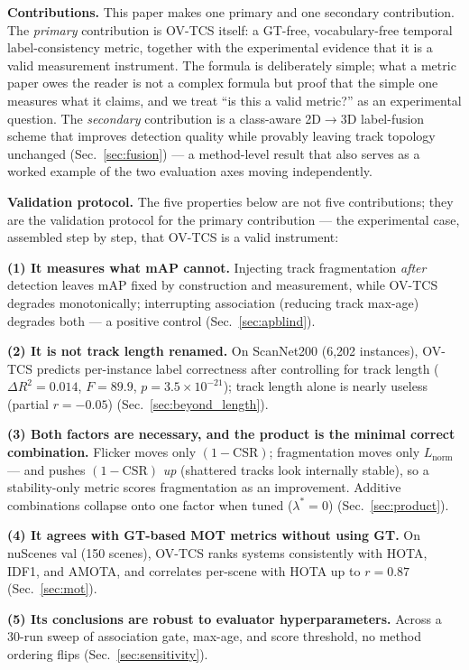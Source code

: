 \documentclass[10pt,twocolumn,letterpaper]{article}
\newcommand{\csr}{\mathrm{CSR}}
\newcommand{\lnorm}{L_{\mathrm{norm}}}
\begin{document}
\noindent\textbf{Contributions.} This paper makes one primary and one
secondary contribution. The \emph{primary} contribution is OV-TCS itself:
a GT-free, vocabulary-free temporal label-consistency metric, together with
the experimental evidence that it is a valid measurement instrument. The
formula is deliberately simple; what a metric paper owes the reader is not a
complex formula but proof that the simple one measures what it claims, and we
treat ``is this a valid metric?'' as an experimental question. The
\emph{secondary} contribution is a class-aware 2D$\to$3D label-fusion scheme
that improves detection quality while provably leaving track topology
unchanged (Sec.~\ref{sec:fusion}) --- a method-level result that also serves
as a worked example of the two evaluation axes moving independently.

\noindent\textbf{Validation protocol.} The five properties below are not
five contributions; they are the validation protocol for the primary
contribution --- the experimental case, assembled step by step, that OV-TCS
is a valid instrument:

\noindent\textbf{(1) It measures what mAP cannot.} Injecting track
fragmentation \emph{after} detection leaves mAP fixed by construction and
measurement, while OV-TCS degrades monotonically; interrupting association
(reducing track max-age) degrades both --- a positive control
(Sec.~\ref{sec:apblind}).

\noindent\textbf{(2) It is not track length renamed.} On ScanNet200
(6{,}202 instances), OV-TCS predicts per-instance label correctness after
controlling for track length ($\Delta R^2{=}0.014$, $F{=}89.9$,
$p{=}3.5{\times}10^{-21}$); track length alone is nearly useless (partial
$r{=}-0.05$) (Sec.~\ref{sec:beyond_length}).

\noindent\textbf{(3) Both factors are necessary, and the product is the
minimal correct combination.} Flicker moves only $(1-\csr)$; fragmentation
moves only $\lnorm$ --- and pushes $(1-\csr)$ \emph{up} (shattered tracks look
internally stable), so a stability-only metric scores fragmentation as an
improvement. Additive combinations collapse onto one factor when tuned
($\lambda^*{=}0$) (Sec.~\ref{sec:product}).

\noindent\textbf{(4) It agrees with GT-based MOT metrics without using GT.}
On nuScenes val (150 scenes), OV-TCS ranks systems consistently with HOTA,
IDF1, and AMOTA, and correlates per-scene with HOTA up to $r{=}0.87$
(Sec.~\ref{sec:mot}).

\noindent\textbf{(5) Its conclusions are robust to evaluator
hyperparameters.} Across a 30-run sweep of association gate, max-age, and
score threshold, no method ordering flips (Sec.~\ref{sec:sensitivity}).
\end{document}
